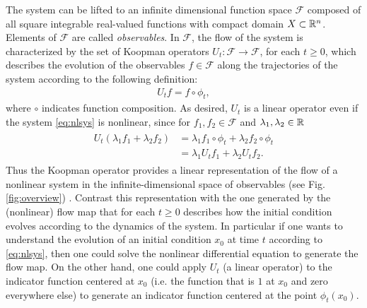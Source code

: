 The system can be lifted to an infinite dimensional function space $\mathcal{F}$ composed of all square integrable real-valued functions with compact domain $X \subset \mathbb{R}^n$.
Elements of $\mathcal{F}$ are called \emph{observables}.
In $\mathcal{F}$, the flow of the system is characterized by the set %
of Koopman operators 
$U_t : \mathcal{F} \to \mathcal{F}$, for each $t \geq 0$,
which describes the evolution of the observables ${f \in \mathcal{F}}$ along the trajectories of the system according to the following definition:
\begin{align}
    U_t f = f \circ \phi_t,      
    \label{eq:koopman}
\end{align}
where $\circ$ indicates function composition.
As desired, $U_t$ is a linear operator even if the system \eqref{eq:nlsys} is nonlinear, since for $f_1, f_2 \in \mathcal{F}$ and $\lambda_1, \lambda_2 \in \mathbb{R}$
\begin{align}
    \begin{split}
    U_t (\lambda_1 f_1 + \lambda_2 f_2) &= \lambda_1 f_1 \circ \phi_t + \lambda_2 f_2 \circ \phi_t \\
    &= \lambda_1 U_t f_1 + \lambda_2 U_t f_2.
    \end{split}
\end{align}
Thus the Koopman operator provides a linear representation of the flow of a nonlinear system in the infinite-dimensional space of observables (see Fig. \ref{fig:overview}) \cite{budivsic2012applied}.
Contrast this representation with the one generated by the (nonlinear) flow map that for each $t \geq 0$ describes how the initial condition evolves according to the dynamics of the system.
In particular if one wants to understand the evolution of an initial condition $x_0$ at time $t$ according to \eqref{eq:nlsys}, then one could solve the nonlinear differential equation to generate the flow map. 
On the other hand, one could apply $U_t$ (a linear operator) to the indicator function centered at $x_0$ (i.e. the function that is $1$ at $x_0$ and zero everywhere else) to generate an indicator function centered at the point $\phi_t(x_0)$.


